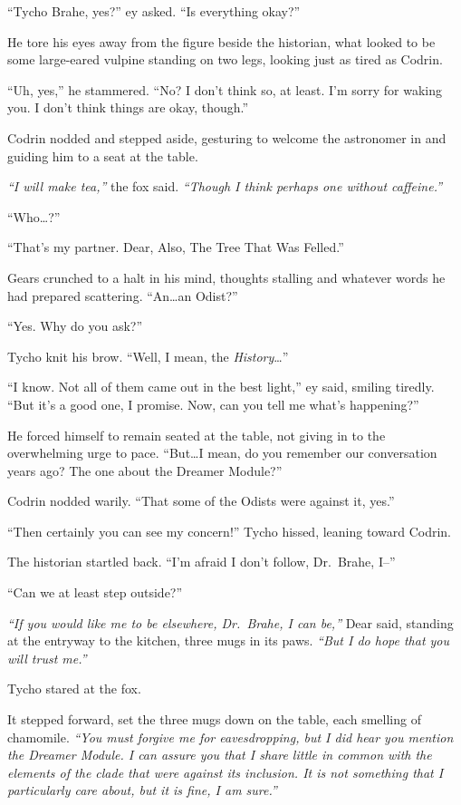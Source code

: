 ``Tycho Brahe, yes?'' ey asked. ``Is everything okay?''

He tore his eyes away from the figure beside the historian, what looked to be some large-eared vulpine standing on two legs, looking just as tired as Codrin.

``Uh, yes,'' he stammered. ``No? I don't think so, at least. I'm sorry for waking you. I don't think things are okay, though.''

Codrin nodded and stepped aside, gesturing to welcome the astronomer in and guiding him to a seat at the table.

\emph{``I will make tea,''} the fox said. \emph{``Though I think perhaps one without caffeine.''}

``Who\ldots{}?''

``That's my partner. Dear, Also, The Tree That Was Felled.''

Gears crunched to a halt in his mind, thoughts stalling and whatever words he had prepared scattering. ``An\ldots an Odist?''

``Yes. Why do you ask?''

Tycho knit his brow. ``Well, I mean, the \emph{History}\ldots{}''

``I know. Not all of them came out in the best light,'' ey said, smiling tiredly. ``But it's a good one, I promise. Now, can you tell me what's happening?''

He forced himself to remain seated at the table, not giving in to the overwhelming urge to pace. ``But\ldots I mean, do you remember our conversation years ago? The one about the Dreamer Module?''

Codrin nodded warily. ``That some of the Odists were against it, yes.''

``Then certainly you can see my concern!'' Tycho hissed, leaning toward Codrin.

The historian startled back. ``I'm afraid I don't follow, Dr.~Brahe, I--''

``Can we at least step outside?''

\emph{``If you would like me to be elsewhere, Dr.~Brahe, I can be,''} Dear said, standing at the entryway to the kitchen, three mugs in its paws. \emph{``But I do hope that you will trust me.''}

Tycho stared at the fox.

It stepped forward, set the three mugs down on the table, each smelling of chamomile. \emph{``You must forgive me for eavesdropping, but I did hear you mention the Dreamer Module. I can assure you that I share little in common with the elements of the clade that were against its inclusion. It is not something that I particularly care about, but it is fine, I am sure.''}

